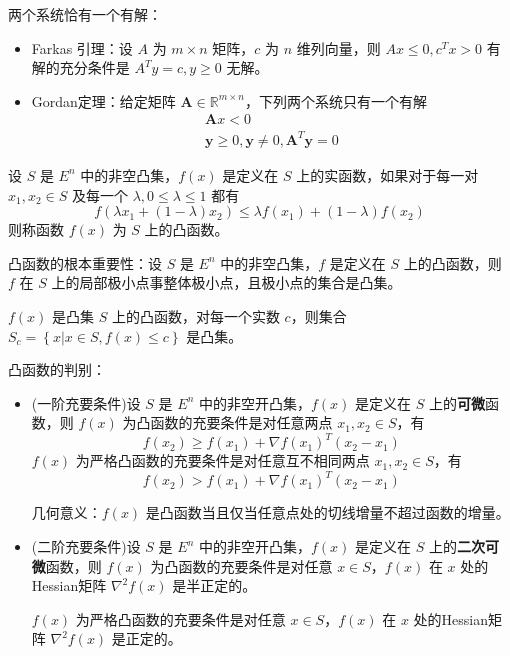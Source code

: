 \begin{remark}
    两个系统恰有一个有解：
    \begin{itemize}
        \item Farkas 引理：设 $A$ 为 $m\times n$ 矩阵，$c$ 为 $n$ 维列向量，则 $Ax \le 0, c^Tx > 0$ 有解的充分条件是 $A^Ty = c, y\ge 0$ 无解。
        \item Gordan定理：给定矩阵 $\boldsymbol{A} \in \mathbb{R}^{m\times n}$，下列两个系统只有一个有解
        \begin{gather*}
            \boldsymbol{A}x < 0\\
            \boldsymbol{y} \ge 0, \boldsymbol{y} \neq 0, \boldsymbol{A}^T\boldsymbol{y} = 0
        \end{gather*}
    \end{itemize}
\end{remark}

\begin{remark}
    设 $S$ 是 $E^n$ 中的非空凸集，$f(x)$ 是定义在 $S$ 上的实函数，如果对于每一对 $x_1, x_2 \in S$ 及每一个 $\lambda, 0\le \lambda \le 1$ 都有 \[f(\lambda x_1 + (1 - \lambda)x_2) \le \lambda f(x_1) + (1 - \lambda)f(x_2)\]
    则称函数 $f(x)$ 为 $S$ 上的凸函数。

    凸函数的根本重要性：设 $S$ 是 $E^n$ 中的非空凸集，$f$ 是定义在 $S$ 上的凸函数，则 $f$ 在 $S$ 上的局部极小点事整体极小点，且极小点的集合是凸集。
\end{remark}

\begin{remark}
    $f(x)$ 是凸集 $S$ 上的凸函数，对每一个实数 $c$，则集合 $S_c = \left\{x | x \in S, f(x) \le c\right\}$ 是凸集。
\end{remark}

\begin{remark}
    凸函数的判别：
    \begin{itemize}
        \item (一阶充要条件)设 $S$ 是 $E^n$ 中的非空开凸集，$f(x)$ 是定义在 $S$ 上的\textbf{可微}函数，则 $f(x)$ 为凸函数的充要条件是对任意两点 $x_1, x_2 \in S$，有 \[f(x_2) \ge f(x_1) + \nabla f(x_1)^T(x_2 - x_1)\]
        $f(x)$ 为严格凸函数的充要条件是对任意互不相同两点 $x_1, x_2 \in S$，有 \[f(x_2) > f(x_1) + \nabla f(x_1)^T(x_2 - x_1)\]

        几何意义：$f(x)$ 是凸函数当且仅当任意点处的切线增量不超过函数的增量。
        \item (二阶充要条件)设 $S$ 是 $E^n$ 中的非空开凸集，$f(x)$ 是定义在 $S$ 上的\textbf{二次可微}函数，则 $f(x)$ 为凸函数的充要条件是对任意 $x \in S$，$f(x)$ 在 $x$ 处的Hessian矩阵 $\nabla ^2f(x)$ 是半正定的。
        
        $f(x)$ 为严格凸函数的充要条件是对任意 $x \in S$，$f(x)$ 在 $x$ 处的Hessian矩阵 $\nabla ^2f(x)$ 是正定的。
    \end{itemize}
\end{remark}

